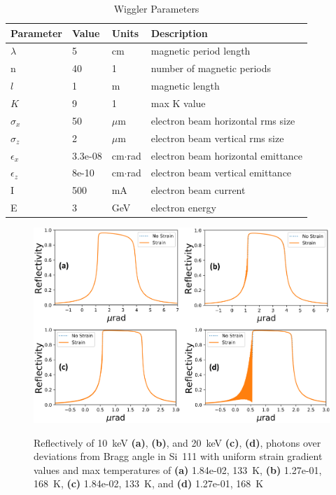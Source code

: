 \documentclass[preprint]{iucr}              %
\begin{document}
\begin{table}\label{ivwbalder}
\caption{Wiggler Parameters}
\begin{tabular}{@{}llll@{}}
Parameter       & Value         & Units     & Description                           \\
\hline
$\lambda$       & 5             & cm        & magnetic period length                \\
n               & 40            & 1         & number of magnetic periods            \\ 
$l$             & 1             & m         & magnetic length                       \\
$K$             & 9             & 1         & max K value                           \\
$\sigma_x$      & 50            & $\mu$m    & electron beam horizontal rms size     \\
$\sigma_z$      & 2             & $\mu$m    & electron beam vertical rms size       \\
$\epsilon_x$    & 3.3e-08       & cm$\cdot$rad    & electron beam horizontal emittance    \\
$\epsilon_z$    & 8e-10         & cm$\cdot$rad    & electron beam vertical emittance      \\
I               & 500           & mA        & electron beam current                 \\
E               & 3             & GeV       & electron energy                       \\
\end{tabular}
\end{table}


\begin{figure}
\caption{Reflectively of 10~keV \textbf{(a)}, \textbf{(b)}, and 20~keV \textbf{(c)}, \textbf{(d)}, photons over deviations from Bragg angle in Si~111 with uniform strain gradient values and max temperatures of \textbf{(a)} 1.84e-02, 133~K, \textbf{(b)}  1.27e-01, 168~K, \textbf{(c)} 1.84e-02, 133~K, and \textbf{(d)}  1.27e-01, 168~K}
\includegraphics[width =\textwidth]{images/111USG.png}
\label{fig:111USG}
\end{figure}
\end{document}
